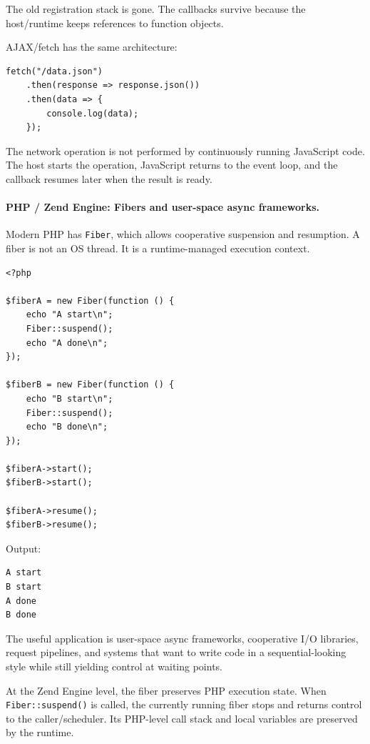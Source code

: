 The old registration stack is gone. The callbacks survive because the host/runtime keeps references to function objects.

AJAX/fetch has the same architecture:

\begin{verbatim}
fetch("/data.json")
    .then(response => response.json())
    .then(data => {
        console.log(data);
    });
\end{verbatim}

The network operation is not performed by continuously running JavaScript code. The host starts the operation, JavaScript returns to the event loop, and the callback resumes later when the result is ready.

\paragraph{PHP / Zend Engine: Fibers and user-space async frameworks.}

Modern PHP has \texttt{Fiber}, which allows cooperative suspension and resumption. A fiber is not an OS thread. It is a runtime-managed execution context.

\begin{verbatim}
<?php

$fiberA = new Fiber(function () {
    echo "A start\n";
    Fiber::suspend();
    echo "A done\n";
});

$fiberB = new Fiber(function () {
    echo "B start\n";
    Fiber::suspend();
    echo "B done\n";
});

$fiberA->start();
$fiberB->start();

$fiberA->resume();
$fiberB->resume();
\end{verbatim}

Output:

\begin{verbatim}
A start
B start
A done
B done
\end{verbatim}

The useful application is user-space async frameworks, cooperative I/O libraries, request pipelines, and systems that want to write code in a sequential-looking style while still yielding control at waiting points.

At the Zend Engine level, the fiber preserves PHP execution state. When \texttt{Fiber::suspend()} is called, the currently running fiber stops and returns control to the caller/scheduler. Its PHP-level call stack and local variables are preserved by the runtime.

